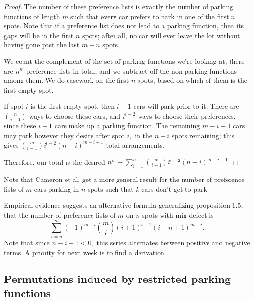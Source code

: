 \begin{proof}
    The number of these preference lists is exactly the number of parking functions of length $m$ such that every car prefers to park in one of the first $n$ spots. Note that if a preference list does not lead to a parking function, then its gaps will be in the first $n$ spots; after all, no car will ever leave the lot without having gone past the last $m-n$ spots.
    
    We count the complement of the set of parking functions we're looking at; there are $n^m$ preference lists in total, and we subtract off the non-parking functions among them. We do casework on the first $n$ spots, based on which of them is the first empty spot.
    
    If spot $i$ is the first empty spot, then $i-1$ cars will park prior to it. There are $\binom{n}{i-1}$ ways to choose these cars, and $i^{i-2}$ ways to choose their preferences, since these $i-1$ cars make up a parking function. The remaining $m-i+1$ cars may park however they desire after spot $i,$ in the $n-i$ spots remaining; this gives $\displaystyle\binom{m}{i-1}i^{i-2}(n-i)^{m-i+1}$ total arrangements.

    Therefore, our total is the desired $\displaystyle n^m-\sum_{i=1}^n \binom{m}{i-1}i^{i-2}(n-i)^{m-i+1}.$
\end{proof}

Note that Cameron et al. get a more general result for the number of preference lists of $m$ cars parking in $n$ spots such that $k$ cars don't get to park. \cite{cameron-johannsen-prellberg-schweitzer-2008}

\begin{remark}
    Empirical evidence suggests an alternative formula generalizing proposition 1.5, that the number of preference lists of $m$ on $n$ spots with min defect is \[\sum_{i=n}^{m} (-1)^{m - i} \binom{m}{i}(i+1)^{i-1}(i - n + 1)^{m-i}.\]
    Note that since $n-i-1<0,$ this series alternates between positive and negative terms. A priority for next week is to find a derivation.
\end{remark}

\subsection*{Permutations induced by restricted parking functions}

